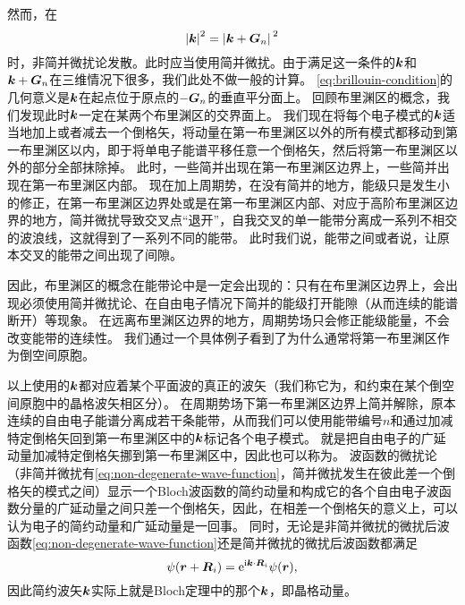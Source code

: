 然而，在
\begin{equation}
    \abs{\vb*{k}}^2 = \abs*{\vb*{k} + \vb*{G}_n}^2
    \label{eq:brillouin-condition}
\end{equation}
时，非简并微扰论发散。此时应当使用简并微扰。由于满足这一条件的$\vb*{k}$和$\vb*{k} + \vb*{G}_n$在三维情况下很多，我们此处不做一般的计算。
\eqref{eq:brillouin-condition}的几何意义是$\vb*{k}$在起点位于原点的$-\vb*{G}_n$的垂直平分面上。
回顾布里渊区的概念，我们发现此时$\vb*{k}$一定在某两个布里渊区的交界面上。
我们现在将每个电子模式的$\vb*{k}$适当地加上或者减去一个倒格矢，将动量在第一布里渊区以外的所有模式都移动到第一布里渊区以内，即于将单电子能谱平移任意一个倒格矢，然后将第一布里渊区以外的部分全部抹除掉。
此时，一些简并出现在第一布里渊区边界上，一些简并出现在第一布里渊区内部。
现在加上周期势，在没有简并的地方，能级只是发生小的修正，在第一布里渊区边界处或是在第一布里渊区内部、对应于高阶布里渊区边界的地方，简并微扰导致交叉点“退开”，自我交叉的单一能带分离成一系列不相交的波浪线，这就得到了一系列不同的能带。
此时我们说，能带之间或者说，让原本交叉的能带之间出现了间隙。

因此，布里渊区的概念在能带论中是一定会出现的：只有在布里渊区边界上，会出现必须使用简并微扰论、在自由电子情况下简并的能级打开能隙（从而连续的能谱断开）等现象。
在远离布里渊区边界的地方，周期势场只会修正能级能量，不会改变能带的连续性。
我们通过一个具体例子看到了为什么通常将第一布里渊区作为倒空间原胞。

以上使用的$\vb*{k}$都对应着某个平面波的真正的波矢（我们称它为，和约束在某个倒空间原胞中的晶格波矢相区分）。
在周期势场下第一布里渊区边界上简并解除，原本连续的自由电子能谱分离成若干条能带，从而我们可以使用能带编号$n$和通过加减特定倒格矢回到第一布里渊区中的$\vb*{k}$标记各个电子模式。
就是把自由电子的广延动量加减特定倒格矢挪到第一布里渊区中，因此也可以称为。
波函数的微扰论（非简并微扰有\eqref{eq:non-degenerate-wave-function}，简并微扰发生在彼此差一个倒格矢的模式之间）显示一个Bloch波函数的简约动量和构成它的各个自由电子波函数分量的广延动量之间只差一个倒格矢，因此，在相差一个倒格矢的意义上，可以认为电子的简约动量和广延动量是一回事。
同时，无论是非简并微扰的微扰后波函数\eqref{eq:non-degenerate-wave-function}还是简并微扰的微扰后波函数都满足
\[
    \psi(\vb*{r} + \vb*{R}_i) = \mathrm{e}^{\mathrm{i} \vb*{k} \cdot \vb*{R}_i} \psi(\vb*{r}),
\]
因此简约波矢$\vb*{k}$实际上就是Bloch定理中的那个$\vb*{k}$，即晶格动量。

